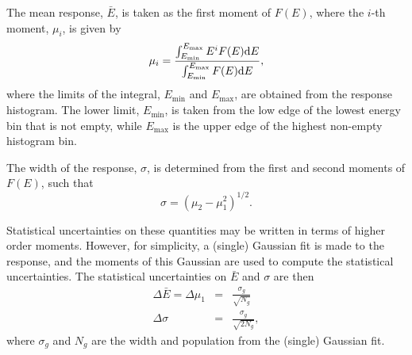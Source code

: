 The mean response, $\bar{E}$, is taken as the first moment of $F(E)$, where the $i$-th moment, $\mu_i$, is given by
\begin{equation}
\label{eqn_moment}
\mu_i = \frac{\int^{E_{\mathrm{max}}}_{E_{\mathrm{min}}}  E^{i} F(E) \mathrm{d} E }{\int^{E_{\mathrm{max}}}_{E_{\mathrm{min}}}  F(E) \mathrm{d} E},
\end{equation}
where the limits of the integral, $E_\mathrm{min}$ and $E_\mathrm{max}$, are obtained from the response histogram. The lower limit, $E_\mathrm{min}$, is taken from the low edge of the lowest energy bin that is not empty, while $E_\mathrm{max}$ is the upper edge of the highest non-empty histogram bin. 

The width of the response, $\sigma$, is determined from the first and second moments of $F(E)$, such that
\begin{equation}
\sigma = \left( \mu_2 - \mu_1^2 \right)^{1/2}.
\label{DG_width_def}
\end{equation}

Statistical uncertainties on these quantities may be written in terms of higher order moments. However, for simplicity, a (single) Gaussian fit is made to the response, and the moments of this Gaussian are used to compute the statistical uncertainties. The statistical uncertainties on $\bar{E}$ and $\sigma$ are then
\begin{eqnarray}
\Delta \bar{E} = \Delta \mu_1 & = & \frac{\sigma_g}{\sqrt{N_g}} \\
\Delta \sigma & = & \frac{\sigma_g}{\sqrt{2N_g}},
\end{eqnarray}
where $\sigma_g$ and $N_g$ are the width and population from the (single) Gaussian fit.




